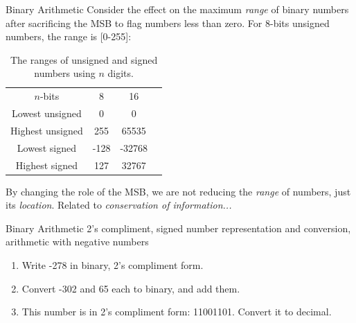 \documentclass{beamer}
\begin{document}
\begin{frame}{Binary Arithmetic}
Consider the effect on the maximum \textit{range} of binary numbers after sacrificing the MSB to flag numbers less than zero.  For 8-bits unsigned numbers, the range is [0-255]: \\ \vspace{0.5cm}
\begin{table}
\small
\centering
\begin{tabular}{c c c c}
$n$-bits & 8 & 16 \\
Lowest unsigned & 0 & 0 \\
Highest unsigned & 255 & 65535 \\
Lowest signed & -128 & -32768 \\
Highest signed & 127 & 32767
\end{tabular}
\caption{\label{tab:ranges} The ranges of unsigned and signed numbers using $n$ digits.}
\end{table}
\small
By changing the role of the MSB, we are not reducing the \textit{range} of numbers, just its \textit{location}.  Related to \textit{conservation of information...}
\end{frame}

\begin{frame}{Binary Arithmetic}
2's compliment, signed number representation and conversion, arithmetic with negative numbers \\ 
\hrulefill
\begin{enumerate}
\item Write -278 in binary, 2's compliment form.
\item Convert -302 and 65 each to binary, and add them.
\item This number is in 2's compliment form: 11001101.  Convert it to decimal. 
\end{enumerate}
\end{frame}
\end{document}
